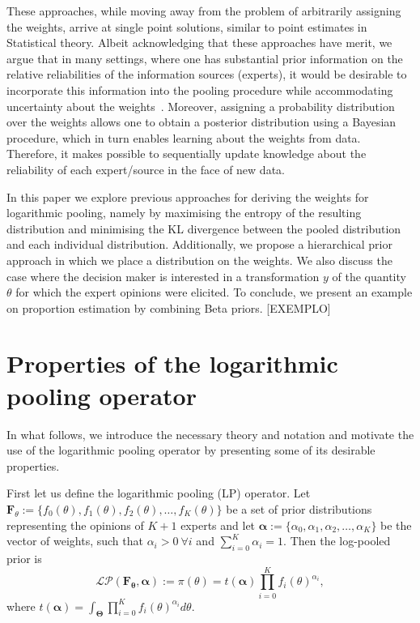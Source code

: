 \documentclass[a4paper, notitlepage, 10pt]{article}
\begin{document}
These approaches, while moving away from the problem of arbitrarily assigning the weights, arrive at single point solutions, similar to point estimates in Statistical theory.
Albeit acknowledging that these approaches have merit, we argue that in many settings, where one has substantial prior information on the relative reliabilities of the information sources (experts), it would be desirable to incorporate this information into the pooling procedure while accommodating uncertainty about the weights~\citep{poole2000}.
Moreover, assigning a probability distribution over the weights allows one to obtain a posterior distribution using a Bayesian procedure, which in turn enables learning about the weights from data.
Therefore, it makes possible to sequentially update knowledge about the reliability of each expert/source in the face of new data.

In this paper we explore previous approaches for deriving the weights for logarithmic pooling, namely by maximising the entropy of the resulting distribution and minimising the KL divergence between the pooled distribution and each individual distribution.
Additionally, we propose a hierarchical prior approach in which we place a distribution on the weights.
We also discuss the case where the decision maker is interested in a transformation $y$ of the quantity $\theta$ for which the expert opinions were elicited.
To conclude, we present an example on proportion estimation by combining Beta priors.
[EXEMPLO]

\section*{Properties of the logarithmic pooling operator}

In what follows, we introduce the necessary theory and notation and motivate the use of the logarithmic pooling operator by presenting some of its desirable properties.

First let us define the logarithmic pooling (LP) operator.
Let $\mathbf{F}_{\theta} := \{f_0(\theta), f_1(\theta), f_2(\theta), \ldots, f_K(\theta)\}$ be a set of prior distributions representing the opinions of $K+1$ experts and let $\boldsymbol\alpha :=\{\alpha_0, \alpha_1, \alpha_2, \ldots, \alpha_K \}$ be the vector of weights, such that $\alpha_i > 0\: \forall i$ and $\sum_{i=0}^K \alpha_i = 1$.
Then the log-pooled prior is
\begin{equation}
\label{eq:logpool}
 \mathcal{LP}(\mathbf{F_\theta}, \boldsymbol\alpha) := \pi(\theta) = t(\boldsymbol\alpha) \prod_{i=0}^K f_i(\theta)^{\alpha_i},
\end{equation}
where $t(\boldsymbol\alpha) = \int_{\boldsymbol\Theta}\prod_{i=0}^K f_i(\theta)^{\alpha_i}d\theta$.
\end{document}
